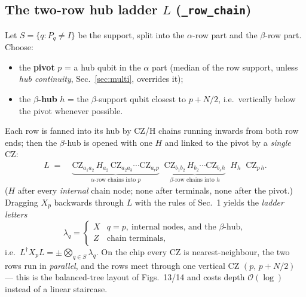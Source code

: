 \documentclass[11pt]{article}
\newcommand{\CZ}{\mathrm{CZ}}
\newcommand{\code}[1]{\texttt{#1}}
\begin{document}
\subsection{The two-row hub ladder $L$ (\code{\_row\_chain})}
Let $S=\{q: P_q\neq I\}$ be the support, split into the $\alpha$-row part
and the $\beta$-row part. Choose:
\begin{itemize}
\item the \textbf{pivot} $p$ = a hub qubit in the $\alpha$ part
  (median of the row support, unless \emph{hub continuity},
  Sec.~\ref{sec:multi}, overrides it);
\item the \textbf{$\beta$-hub} $h$ = the $\beta$-support qubit closest to
  $p+N/2$, i.e.\ vertically below the pivot whenever possible.
\end{itemize}
Each row is fanned into its hub by CZ/H chains running inwards from both
row ends; then the $\beta$-hub is opened with one $H$ and linked to the
pivot by a \emph{single} CZ:
\begin{align}
L \;=\;& \underbrace{\CZ_{a_1 a_2}\, H_{a_2}\, \CZ_{a_2 a_3}\cdots
        \CZ_{a_{r} p}}_{\alpha\text{-row chains into } p}\;\;
        \underbrace{\CZ_{b_1 b_2}\, H_{b_2}\cdots \CZ_{b_s h}}_{
        \beta\text{-row chains into } h}\;\;
        H_h\;\; \CZ_{p\,h}.
\end{align}
($H$ after every \emph{internal} chain node; none after terminals, none
after the pivot.) Dragging $X_p$ backwards through $L$ with the rules of
Sec.~1 yields the \emph{ladder letters}
\begin{equation}
\lambda_q=\begin{cases}
 X & q=p,\ \text{internal nodes, and the }\beta\text{-hub},\\
 Z & \text{chain terminals},
\end{cases}
\end{equation}
i.e.\ $L^{\dagger}X_pL = \pm\bigotimes_{q\in S}\lambda_q$.
On the chip every CZ is nearest-neighbour, the two rows run in
\emph{parallel}, and the rows meet through one vertical CZ
$(p,\,p{+}N/2)$ --- this is the balanced-tree layout of Figs.~13/14 and
costs depth $\mathcal{O}(\log)$ instead of a linear staircase.
\end{document}
